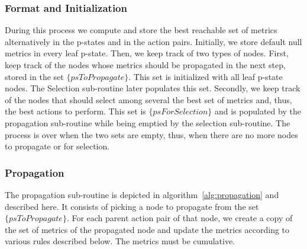     \subsubsection{Format and Initialization}

During this process we compute and store the best reachable set of metrics alternatively in the p-states and in the action pairs. Initially, we store default null metrics in every leaf p-state. Then, we keep track of two types of nodes. First, keep track of the nodes whose metrics should be propagated in the next step, stored in the set $\{psToPropagate\}$. This set is initialized with all leaf p-state nodes. The Selection sub-routine later populates this set. Secondly, we keep track of the nodes that should select among several the best set of metrics and, thus, the best actions to perform. This set is $\{psForSelection\}$ and is populated by the propagation sub-routine while being emptied by the selection sub-routine. The process is over when the two sets are empty, thus, when there are no more nodes to propagate or for selection.


    \subsubsection{Propagation}

The propagation sub-routine is depicted in algorithm~\ref{alg:propagation} and described here. It consists of picking a node to propagate from the set $\{psToPropagate\}$. For each parent action pair of that node, we create a copy of the set of metrics of the propagated node and update the metrics according to various rules described below.
The metrics must be cumulative. 


